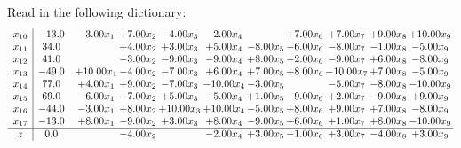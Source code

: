 \documentclass[9pt]{article}
\begin{document}
Read in the following dictionary:
\[\begin{array}{c| c c@{\hskip 2pt} c@{\hskip 2pt} c@{\hskip 2pt} c@{\hskip 2pt} c@{\hskip 2pt} c@{\hskip 2pt} c@{\hskip 2pt} c@{\hskip 2pt} c@{\hskip 2pt} }
 x_{10}   &  -13.0 & -3.00 x_{1} & +  7.00 x_{2} & -4.00 x_{3} & -2.00 x_{4} &   & +  7.00 x_{6} & +  7.00 x_{7} & +  9.00 x_{8} & + 10.00 x_{9}\\
 x_{11}   &  34.0  &   & +  4.00 x_{2} & +  3.00 x_{3} & +  5.00 x_{4} & -8.00 x_{5} & -6.00 x_{6} & -8.00 x_{7} & -1.00 x_{8} & -5.00 x_{9}\\
 x_{12}   &  41.0  &   & -3.00 x_{2} & -9.00 x_{3} & -9.00 x_{4} & +  8.00 x_{5} & -2.00 x_{6} & -9.00 x_{7} & +  6.00 x_{8} & -8.00 x_{9}\\
 x_{13}   &  -49.0 & + 10.00 x_{1} & -4.00 x_{2} & -7.00 x_{3} & +  6.00 x_{4} & +  7.00 x_{5} & +  8.00 x_{6} & -10.00 x_{7} & +  7.00 x_{8} & -5.00 x_{9}\\
 x_{14}   &  77.0 & +  4.00 x_{1} & +  9.00 x_{2} & -7.00 x_{3} & -10.00 x_{4} & -3.00 x_{5} &   & -5.00 x_{7} & -8.00 x_{8} & -10.00 x_{9}\\
 x_{15}   &  69.0 & -6.00 x_{1} & -7.00 x_{2} & +  5.00 x_{3} & -5.00 x_{4} & +  1.00 x_{5} & -9.00 x_{6} & +  2.00 x_{7} & -9.00 x_{8} & +  9.00 x_{9}\\
 x_{16}   &  -44.0 & -3.00 x_{1} & +  8.00 x_{2} & + 10.00 x_{3} & + 10.00 x_{4} & -5.00 x_{5} & +  8.00 x_{6} & +  9.00 x_{7} & +  7.00 x_{8} & -8.00 x_{9}\\
 x_{17}   &  -13.0 & +  8.00 x_{1} & -9.00 x_{2} & +  3.00 x_{3} & +  8.00 x_{4} & -9.00 x_{5} & +  6.00 x_{6} & +  1.00 x_{7} & +  8.00 x_{8} & -10.00 x_{9}\\
\hline
z    &  0.0  &   & -4.00 x_{2} &   & -2.00 x_{4} & +  3.00 x_{5} & -1.00 x_{6} & +  3.00 x_{7} & -4.00 x_{8} & +  3.00 x_{9}\\
\end{array}\]
\end{document}
